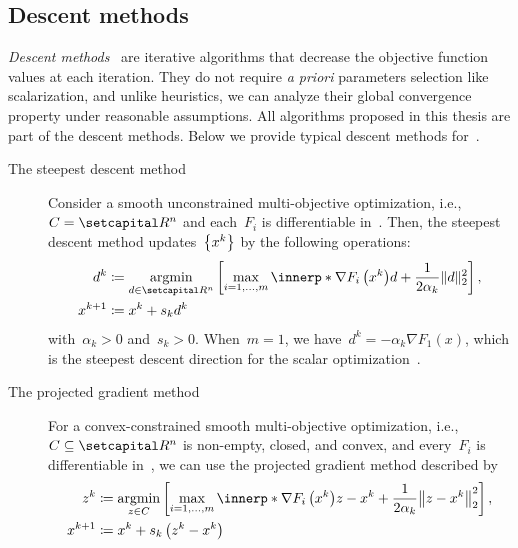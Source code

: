 \documentclass[../../main]{subfiles}
\begin{document}
\subsection{Descent methods} 
\emph{Descent methods}~\cite{Fukuda2014} are iterative algorithms that decrease the objective function values at each iteration.
They do not require \emph{a priori} parameters selection like scalarization, and unlike heuristics, we can analyze their global convergence property under reasonable assumptions.
All algorithms proposed in this thesis are part of the descent methods.
Below we provide typical descent methods for~.

\begin{example} 
    \begin{description}
        \item[The steepest descent method~\cite{Fliege2000,GranaDrummond2005}] Consider a smooth unconstrained multi-objective optimization, i.e.,~$C = \setR^n$ and each~$F_i$ is differentiable in~.
            Then, the steepest descent method updates~$\set*{x^k}$ by the following operations:
            \begin{align} \label{eq:steepest_descent}
                d^k &\coloneqq \argmin_{d \in \setR^n} \left[ \max_{i = 1, \dots, m} \innerp*{\nabla F_i\left(x^k\right)}{d} + \frac{1}{2 \alpha_k} \norm{d}_2^2 \right], \\
                x^{k + 1} &\coloneqq x^k + s_k d^k
            \end{align}
            with~$\alpha_k > 0$ and~$s_k > 0$.
            When~$m = 1$, we have~$d^k = - \alpha_k \nabla F_1(x)$, which is the steepest descent direction for the scalar optimization~\cite{Cauchy1847}.
        \item[The projected gradient method~\cite{Grana-Drummond2004}] For a convex-constrained smooth multi-objective optimization, i.e.,~$C \subseteq \setR^n$ is non-empty, closed, and convex, and every~$F_i$ is differentiable in~, we can use the projected gradient method described by
            \begin{equation} \label{eq:proj_grad}
                \begin{aligned} 
                    z^k &\coloneqq \argmin_{z \in C} \left[ \max_{i = 1, \dots, m} \innerp*{\nabla F_i\left(x^k\right)}{z - x^k} + \frac{1}{2 \alpha_k} \norm*{z - x^k}_2^2 \right], \\
                    x^{k + 1} &\coloneqq x^k + s_k \left(z^k - x^k \right)

\end{aligned}
\end{equation}
\end{description}
\end{example}
\end{document}
